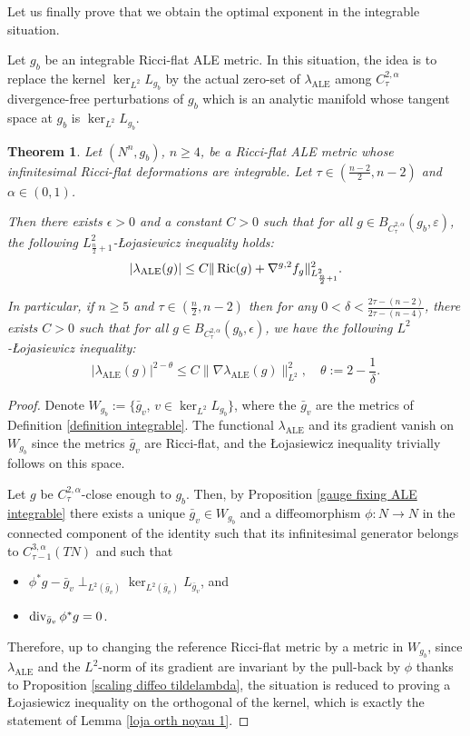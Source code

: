 \documentclass[a4paper,11pt,reqno]{amsart}
\newtheorem{theo}[defn]{Theorem}
\def\Ric{\mathop{\rm Ric}\nolimits}
\def\div{\mathop{\rm div}\nolimits}
\def\Ric{\mathop{\rm Ric}\nolimits}
\def\div{\mathop{\rm div}\nolimits}
\numberwithin{equation}{section}
\begin{document}
	
	Let us finally prove that we obtain the optimal exponent in the integrable situation.
	
	Let $g_b$ be an integrable Ricci-flat ALE metric. In this situation, the idea is to replace the kernel $\ker_{L^2}L_{g_b}$ by the actual zero-set of $\lambda_{\operatorname{ALE}}$ among $C^{2,\alpha}_\tau$ divergence-free perturbations of $g_b$ which is an analytic manifold whose tangent space at $g_b$ is $\ker_{L^2}L_{g_b}$.
	
	\begin{theo}\label{theo-loja-int-opt}
		Let $(N^n,g_b)$, $n\geq 4$, be a Ricci-flat ALE metric whose infinitesimal Ricci-flat deformations are integrable. Let $\tau\in(\frac{n-2}{2},n-2)$ and $\alpha\in(0,1)$.
		
		Then there exists $\epsilon>0$ and a constant $C>0$ such that for all $g\in B_{C^{2,\alpha}_{\tau}}(g_b,\varepsilon)$, the following $L^2_{\frac{n}{2}+1}$-\L{}ojasiewicz inequality holds: 
		\begin{equation*}
		|\lambda_{\operatorname{ALE}}(g)|\leq C \|\Ric(g)+\nabla^{g,2}f_g\|_{L^2_{\frac{n}{2}+1}}^{2}. 
		\end{equation*}
		
		In particular, if $n\geq 5$ and $\tau\in(\frac{n}{2},n-2)$ then for any $0<\delta<\frac{2\tau-(n-2)}{2\tau-(n-4)}$, there exists $C>0$ such that for all $g\in B_{C^{2,\alpha}_\tau}(g_b,\epsilon)$, we have the following $L^2$-\L{}ojasiewicz inequality:
		$$ |\lambda_{\operatorname{ALE}}(g)|^{2-\theta}\leq C \|\nabla \lambda_{\operatorname{ALE}}(g)\|_{L^2}^{2}, \quad\theta:=2-\frac{1}{\delta}.$$
	\end{theo}
	
	\begin{proof}
		Denote $W_{g_b}:= \{\bar{g}_v$,  $v\in\ker_{L^2}L_{g_b}\}$, where the $ \bar{g}_v $ are the metrics of Definition \ref{definition integrable}. The functional $\lambda_{\operatorname{ALE}}$ and its gradient vanish on $W_{g_b}$ since the  metrics $\bar{g}_v$ are Ricci-flat, and the \L{}ojasiewicz inequality trivially follows on this space.
		
		Let $g$ be $C^{2,\alpha}_\tau$-close enough to $g_b$. Then, by Proposition \ref{gauge fixing ALE integrable} there exists a unique $\bar{g}_v\in W_{g_b}$ and a diffeomorphism $\phi:N\to N$ in the connected component of the identity such that its infinitesimal generator belongs to $C^{3,\alpha}_{\tau-1}(TN)$ and such that 
		\begin{itemize}
			\item $ \phi^*g - \bar{g}_v \perp_{L^2(\bar{g}_v)}\ker_{L^2(\bar{g}_v)}L_{\bar{g}_v} $, and
			\item $\div_{\bar{g}_v}\phi^*g = 0$.
		\end{itemize}
		Therefore, up to changing the reference Ricci-flat metric by a metric in $W_{g_b}$, since $\lambda_{\operatorname{ALE}}$ and the $L^2$-norm of its gradient are invariant by the pull-back by $\phi$ thanks to Proposition \ref{scaling diffeo tildelambda}, the situation is reduced to proving a \L{}ojasiewicz inequality on the orthogonal of the kernel, which is exactly the statement of Lemma \ref{loja orth noyau 1}.
	\end{proof}
	
\end{document}
